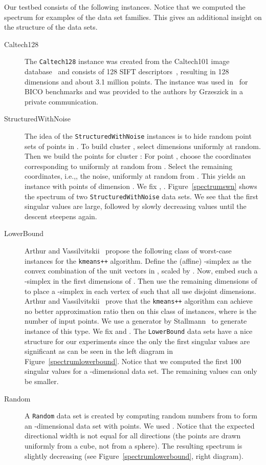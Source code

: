 \documentclass[a4paper]{scrartcl}
\makeatletter
\newcommand{\ie}{i.\nolinebreak[4]\hspace{0.125em}\nolinebreak[4]e.,\@\xspace}
\makeatother
\begin{document}
Our testbed consists of the following instances. Notice that we computed the spectrum for examples of the data set families. This gives an additional insight on the structure of the data sets.
\begin{description}
\item[Caltech128] The \texttt{Caltech128} instance was created from the Caltech101
image database~\cite{FFFP2004} and consists of 128 SIFT descriptors~\cite{Lowe04},
resulting in 128 dimensions and about 3.1 million points.
The instance was used in~\cite{FGSSS13} for BICO benchmarks and was provided to the
authors by Grzeszick in a private communication.
\item[StructuredWithNoise]
The idea of the \texttt{StructuredWithNoise} instances is to  hide 
random point sets of  points in .
To build cluster , select  dimensions
 uniformly at random.
Then we build the  points for cluster : For point , choose
the coordinates corresponding to  uniformly at random from .
Select the remaining coordinates, \ie, the noise, uniformly at random
from .
This yields an instance with  points of dimension .
We fix , .
Figure~\ref{spectrumswn} shows the spectrum of two \texttt{StructuredWithNoise} data sets. We see that the first singular values are large, followed by slowly decreasing values until the descent steepens again.

\item[LowerBound]
Arthur and Vassilvitskii~\cite{AV07} propose the following class of worst-case
instances for the \texttt{kmeans++} algorithm.
Define the (affine) -simplex as the convex combination of the 
unit vectors  in , scaled by .
Now, embed such a -simplex 
in the first  dimensions of .
Then use the remaining  dimensions of  to place a -simplex 
in each vertex  of  such that all  use disjoint dimensions.
Arthur and Vassilvitskii~\cite{AV07} prove that the \texttt{kmeans++} algorithm
can achieve no better approximation ratio then  on this class of instances,
where  is the number of input points. We use a generator by Stallmann~\cite{Stallmann2014}
to generate instance of this type. We fix  and .
The \texttt{LowerBound} data sets have a nice structure for our experiments since the only the first singular values are significant as can be seen in the left diagram in Figure~\ref{spectrumlowerbound}. Notice that we computed the first 100 singular values for a -dimensional data set. The remaining values can only be smaller.
\item[Random]
A \texttt{Random} data set is created by computing  random numbers from  to form an -dimensional data set with  points. We used . Notice that the expected directional width is not equal for all directions (the points are drawn uniformly from a cube, not from a sphere). The resulting spectrum is slightly decreasing (see Figure~\ref{spectrumlowerbound}, right diagram).

\end{description}
\end{document}
